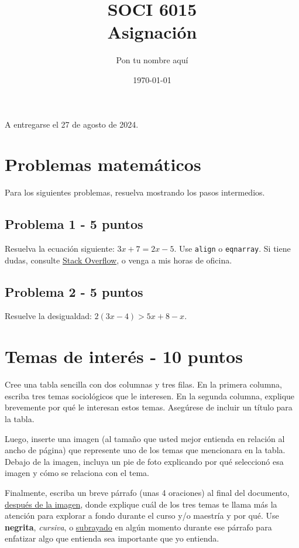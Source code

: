 \documentclass[11pt]{article} %
\title{SOCI 6015\\ Asignación \textnumero 1}
\author{Pon tu nombre aquí}
\date{\today}
\begin{document}
\maketitle
\begin{center}
   A entregarse el 27 de agosto de 2024. 
\end{center}


\section{Problemas matemáticos}

Para los siguientes problemas, resuelva mostrando los pasos intermedios.

\subsection{Problema 1 - 5 puntos} 

Resuelva la ecuación siguiente: $3x + 7 = 2x - 5$. Use \texttt{align} o \texttt{eqnarray}. Si tiene dudas, consulte \href{https://tex.stackexchange.com}{Stack Overflow}, o venga a mis horas de oficina.

\subsection{Problema 2 - 5 puntos} 

Resuelve la desigualdad: $2(3x - 4) > 5x + 8 - x$. 

\section{Temas de interés - 10 puntos}

Cree una tabla sencilla con dos columnas y tres filas. En la primera columna, escriba tres temas sociológicos que le interesen. En la segunda columna, explique brevemente por qué le interesan estos temas. Asegúrese de incluir un título para la tabla. 

Luego, inserte una imagen (al tamaño que usted mejor entienda en relación al ancho de página) que represente uno de los temas que mencionara en la tabla. Debajo de la imagen, incluya un pie de foto explicando por qué seleccionó esa imagen y cómo se relaciona con el tema. 

Finalmente, escriba un breve párrafo (unas 4 oraciones) al final del documento, \underline{después de la imagen}, donde explique cuál de los tres temas te llama más la atención para explorar a fondo durante el curso y/o maestría y por qué. Use \textbf{negrita}, \textit{cursiva}, o \underline{subrayado} en algún momento durante ese párrafo para enfatizar algo que entienda sea importante que yo entienda.
\end{document}
